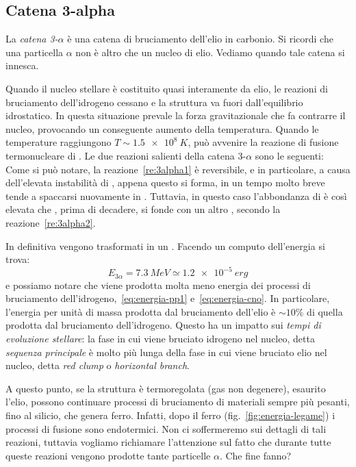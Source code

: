 \subsection{Catena 3-alpha}
La \emph{catena 3-$\alpha$} è una catena di bruciamento dell'elio in carbonio. Si ricordi che una particella $\alpha$ non è altro che un nucleo di elio. Vediamo quando tale catena si innesca.

Quando il nucleo stellare è costituito quasi interamente da elio, le reazioni di bruciamento dell'idrogeno cessano e la struttura va fuori dall'equilibrio idrostatico. In questa situazione prevale la forza gravitazionale che fa contrarre il nucleo, provocando un conseguente aumento della temperatura. Quando le temperature raggiungono $T \sim \SI{1.5e8}{K}$, può avvenire la reazione di fusione termonucleare di . Le due reazioni salienti della catena 3-$\alpha$ sono le seguenti:
Come si può notare, la reazione~\ref{re:3alpha1} è reversibile, e in particolare, a causa dell'elevata instabilità di , appena questo si forma, in un tempo molto breve tende a spaccarsi nuovamente in . Tuttavia, in questo caso l'abbondanza di  è così elevata che , prima di decadere, si fonde con un altro , secondo la reazione~\ref{re:3alpha2}.

In definitiva  vengono trasformati in un . Facendo un computo dell'energia si trova:
\begin{equation}\label{eq:energia-3alpha}
    E_{3\alpha} = \SI{7.3}{MeV} \simeq \SI{1.2e-5}{erg}
\end{equation}
e possiamo notare che viene prodotta molta meno energia dei processi di bruciamento dell'idrogeno,~\eqref{eq:energia-pp1} e~\eqref{eq:energia-cno}. In particolare, l'energia per unità di massa prodotta dal bruciamento dell'elio è $\sim 10\%$ di quella prodotta dal bruciamento dell'idrogeno. Questo ha un impatto sui \emph{tempi di evoluzione stellare}: la fase in cui viene bruciato idrogeno nel nucleo, detta \emph{sequenza principale} è molto più lunga della fase in cui viene bruciato elio nel nucleo, detta \emph{red clump} o \emph{horizontal branch}.

A questo punto, se la struttura è termoregolata (gas non degenere), esaurito l'elio, possono continuare processi di bruciamento di materiali sempre più pesanti, fino al silicio, che genera ferro. Infatti, dopo il ferro (fig.~\ref{fig:energia-legame}) i processi di fusione sono endotermici. Non ci soffermeremo sui dettagli di tali reazioni, tuttavia vogliamo richiamare l'attenzione sul fatto che durante tutte queste reazioni vengono prodotte tante particelle $\alpha$. Che fine fanno?

